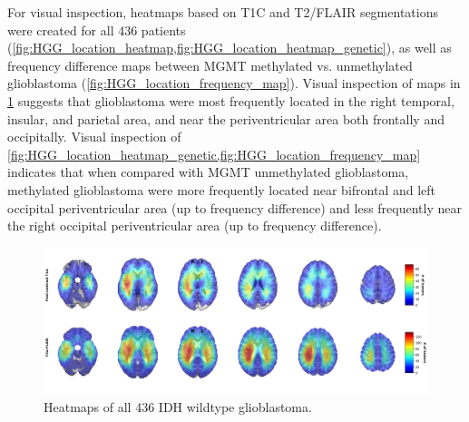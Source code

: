 For visual inspection, heatmaps based on \gls{T1C} and \gls{T2}/\gls{FLAIR} segmentations were created for all 436 patients (\cref{fig:HGG_location_heatmap,fig:HGG_location_heatmap_genetic}), as well as frequency difference maps between MGMT methylated vs. unmethylated glioblastoma (\cref{fig:HGG_location_frequency_map}).
Visual inspection of maps in \cref{fig:HGG_location_heatmap} suggests that glioblastoma were most frequently located in the right temporal, insular, and parietal area, and near the periventricular area both frontally and occipitally.
Visual inspection of \cref{fig:HGG_location_heatmap_genetic,fig:HGG_location_frequency_map} indicates that when compared with \gls{MGMT} unmethylated glioblastoma, methylated glioblastoma were more frequently located near bifrontal and left occipital periventricular area (up to  frequency difference) and less frequently near the right occipital periventricular area (up to  frequency difference).

\begin{figure}
    \centering
    \includegraphics[width=\textwidth]{Figures/Heatmap.png}

    \caption{Heatmaps of all 436 \acrshort{IDH} wildtype glioblastoma.}\label{fig:HGG_location_heatmap}
\end{figure}


